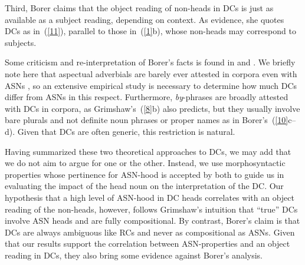 \documentclass[output=paper]{langsci/langscibook}
\begin{document}
\begin{exe}
\end{exe}

Third, Borer claims that the object reading of non-heads in DCs is just as available as a subject reading, depending on context.
As evidence, she quotes DCs  as in~(\ref{11}), parallel to those in~(\ref{1}b), whose non-heads may correspond to subjects. 

\begin{exe}
\end{exe}

Some criticism and re-interpretation of Borer's facts is found in \cite{iordachioaia:alexiadou:pairamidis:17} and \cite{iordachioaia:toappear}.
We briefly note here that aspectual adverbials are barely ever attested in corpora even with ASNs \citep[39--42]{lieber:16}, so an extensive empirical study is necessary to determine how much DCs differ from ASNs in this respect.
Furthermore, \textit{by}-phrases are broadly attested with DCs in corpora, as Grimshaw's~(\ref{8}b) also predicts, but they usually involve bare plurals and not definite noun phrases or proper names as in Borer's~(\ref{10}c--d).
Given that DCs are often generic, this restriction is natural.

Having summarized these two  theoretical approaches to DCs, we may add that we do not aim to argue for one or the other. Instead, we use morphosyntactic properties whose pertinence for ASN-hood is accepted by both to guide us in evaluating the impact of the head noun on the interpretation of the DC. Our hypothesis that a high level of ASN-hood in DC heads correlates with an object reading of the non-heads, however, follows Grimshaw's intuition that ``true''  DCs involve ASN heads and are fully compositional. By contrast, Borer's claim is that DCs are always ambiguous like RCs and never as compositional as ASNs.
 {Given that our results support the correlation between ASN-properties and an object reading in DCs, they also bring some evidence against Borer's analysis.}
\end{document}
